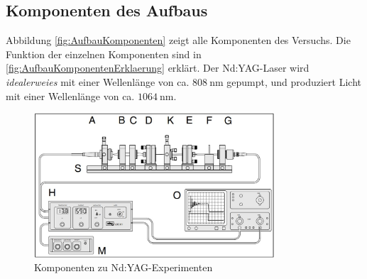 \documentclass[../main.tex]{subfiles}
\begin{document}
    \subsection{Komponenten des Aufbaus}\label{sec:Aufbau:Komponenten}
        Abbildung \ref{fig:AufbauKomponenten} zeigt alle Komponenten des Versuchs. Die Funktion der einzelnen Komponenten sind in \ref{fig:AufbauKomponentenErklaerung} erklärt. Der Nd:YAG-Laser wird \textit{idealerweies} mit einer Wellenlänge von ca. $\SI{808}{\nano\metre}$ gepumpt, und produziert Licht mit einer Wellenlänge von ca. $\SI{1064}{\nano\metre}$.
        \begin{figure}[H]
            \centering
            \includegraphics[width=0.8\textwidth]{Bilddateien/Versuchsaufbau/Komponenten.jpg}
            \caption{Komponenten zu Nd:YAG-Experimenten \cite[p.25]{doc:experiment08}}
            \label{fig:AubauKomponenten}
        \end{figure}
\end{document}
